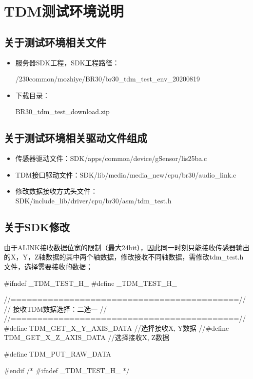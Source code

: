 \section{TDM测试环境说明}
\subsection{关于测试环境相关文件}
\begin{itemize}
\item 服务器SDK工程，SDK工程路径：
\begin{messagebox}
/230common/mozhiye/BR30/br30_tdm_test_env_20200819
\end{messagebox}
\item 下载目录：
\begin{messagebox}
BR30_tdm_test_download.zip
\end{messagebox}
\end{itemize}

\subsection{关于测试环境相关驱动文件组成}
\begin{itemize}
\item 传感器驱动文件：SDK/apps/common/device/gSensor/lis25ba.c
\item TDM接口驱动文件：SDK/lib/media/media\_new/cpu/br30/audio\_link.c
\item 修改数据接收方式头文件：SDK/include\_lib/driver/cpu/br30/asm/tdm\_test.h
\end{itemize}

\subsection{关于SDK修改}
由于ALINK接收数据位宽的限制（最大24bit），因此同一时刻只能接收传感器输出的X，Y，Z轴数据的其中两个轴数据，修改接收不同轴数据，需修改tdm\_test.h文件，选择需要接收的数据；
\begin{myccode}[caption={tdm\_test.h}]
#ifndef _TDM_TEST_H_
#define _TDM_TEST_H_

//===========================================//
//              接收TDM数据选择：二选一      //
//===========================================//
#define TDM_GET_X_Y_AXIS_DATA 		//选择接收X, Y数据
//#define TDM_GET_X_Z_AXIS_DATA     //选择接收X, Z数据

#define TDM_PUT_RAW_DATA

#endif /* #ifndef _TDM_TEST_H_ */
\end{myccode}

